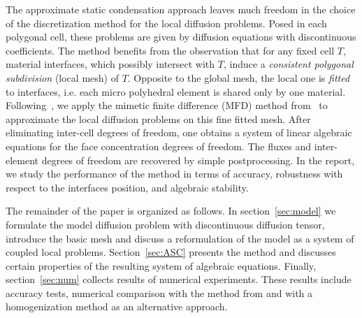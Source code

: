 \documentclass[12pt]{article}
\begin{document}
The approximate static condensation approach leaves much freedom in the choice of the discretization method for the local diffusion problems.  Posed in each polygonal cell, these problems are given by  diffusion equations with  discontinuous coefficients. The method benefits from the observation that   for any fixed cell $T$,  material interfaces, which possibly intersect with $T$,  induce a \emph{consistent polygonal subdivision} (local mesh) of $T$. Opposite to the global mesh, the local one is \emph{fitted} to interfaces, i.e. each micro polyhedral element is shared only by one material. Following~\cite{kikinzon2017approximate}, we apply the mimetic finite difference (MFD) method from~\cite{lipnikov2014mimetic} to approximate the local diffusion problems on this fine fitted mesh.
After eliminating inter-cell degrees of freedom, one obtains a system of linear algebraic equations for the face concentration degrees of freedom. The fluxes and inter-element degrees of freedom are recovered by simple postprocessing. In the report, we study the performance of the method in terms of accuracy, robustness with respect to the interfaces position,  and algebraic stability.

The remainder of the paper is organized as follows. In section~\ref{sec:model} we formulate the model diffusion problem with discontinuous diffusion tensor, introduce the basic mesh and discuss a reformulation of the model as a system of coupled local problems. Section~\ref{sec:ASC} presents the method and discusses certain  properties of the resulting  system of algebraic equations. Finally, section~\ref{sec:num} collects results of numerical experiments. These results include accuracy tests, numerical comparison with the method from  \cite{kikinzon2017approximate} and with a homogenization method as an alternative approach.


	
\end{document}

